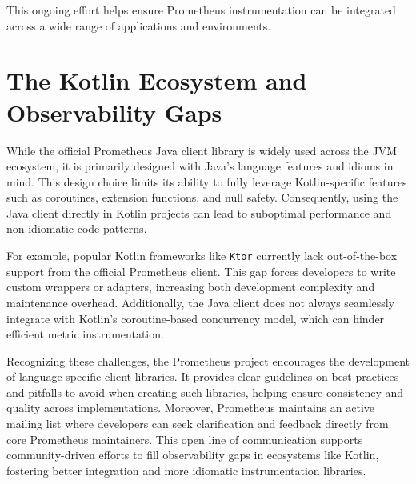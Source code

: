 This ongoing effort helps ensure Prometheus instrumentation can be integrated across a wide range of applications and environments.

\section{The Kotlin Ecosystem and Observability Gaps}\label{sec:the-kotlin-ecosystem-and-observability-gaps}

While the official Prometheus Java client library is widely used across the \ac{JVM} ecosystem, it is primarily
designed with Java’s language features and idioms in mind.
This design choice limits its ability to fully leverage Kotlin-specific features such as coroutines, extension functions, and null safety.
Consequently, using the Java client directly in Kotlin projects can lead to suboptimal performance and non-idiomatic code patterns.

For example, popular Kotlin frameworks like \texttt{Ktor} currently lack out-of-the-box support from the official Prometheus client.
This gap forces developers to write custom wrappers or adapters, increasing both development complexity and maintenance overhead.
Additionally, the Java client does not always seamlessly integrate with Kotlin’s coroutine-based concurrency model, which can hinder efficient metric instrumentation.

Recognizing these challenges, the Prometheus project encourages the development of language-specific client libraries.
It provides clear guidelines on best practices and pitfalls to avoid when creating such libraries, helping ensure consistency and quality across implementations.
Moreover, Prometheus maintains an active mailing list where developers can seek clarification and feedback directly from core Prometheus maintainers.
This open line of communication supports community-driven efforts to fill observability gaps in ecosystems like Kotlin, fostering better integration and more idiomatic instrumentation libraries.

